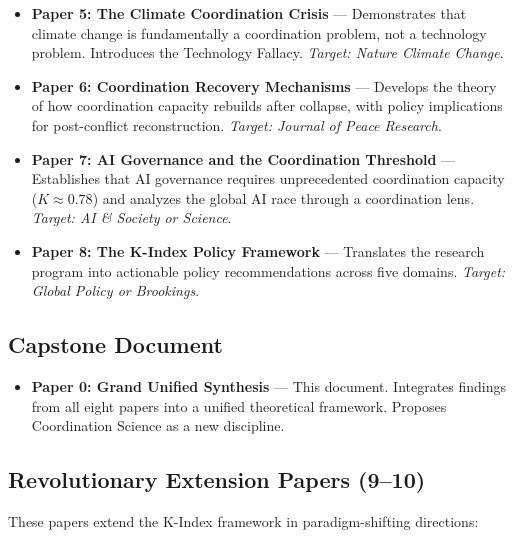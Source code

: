 \documentclass[12pt,letterpaper]{article}
\begin{document}
\begin{itemize}
    \item \textbf{Paper 5: The Climate Coordination Crisis} --- Demonstrates that climate change is fundamentally a coordination problem, not a technology problem. Introduces the Technology Fallacy. \textit{Target: Nature Climate Change}.

    \item \textbf{Paper 6: Coordination Recovery Mechanisms} --- Develops the theory of how coordination capacity rebuilds after collapse, with policy implications for post-conflict reconstruction. \textit{Target: Journal of Peace Research}.

    \item \textbf{Paper 7: AI Governance and the Coordination Threshold} --- Establishes that AI governance requires unprecedented coordination capacity ($K \approx 0.78$) and analyzes the global AI race through a coordination lens. \textit{Target: AI \& Society or Science}.

    \item \textbf{Paper 8: The K-Index Policy Framework} --- Translates the research program into actionable policy recommendations across five domains. \textit{Target: Global Policy or Brookings}.
\end{itemize}

\subsection{Capstone Document}

\begin{itemize}
    \item \textbf{Paper 0: Grand Unified Synthesis} --- This document. Integrates findings from all eight papers into a unified theoretical framework. Proposes Coordination Science as a new discipline.
\end{itemize}

\subsection{Revolutionary Extension Papers (9--10)}

These papers extend the K-Index framework in paradigm-shifting directions:
\end{document}
